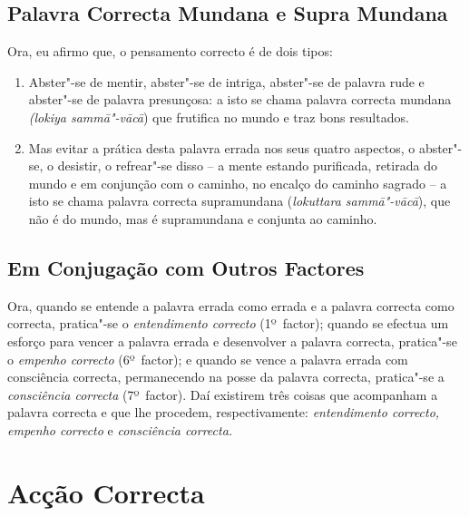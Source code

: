 
\subsection{Palavra Correcta Mundana e Supra Mundana}

Ora, eu afirmo que, o pensamento correcto é de dois tipos:

\begin{enumerate}

  \item Abster"-se de mentir, abster"-se de intriga, abster"-se de palavra rude e
        abster"-se de palavra presunçosa: a isto se chama palavra correcta
        mundana \emph{(lokiya sammā"-vācā}) que frutifica no mundo e traz bons
        resultados.

  \item Mas evitar a prática desta palavra errada nos seus quatro aspectos, o
        abster"-se, o desistir, o refrear"-se disso -- a mente estando purificada,
        retirada do mundo e em conjunção com o caminho, no encalço do caminho
        sagrado -- a isto se chama palavra correcta supramundana
        (\emph{lokuttara sammā"-vācā}), que não é do mundo, mas é supramundana e
        conjunta ao caminho.

\end{enumerate}

\subsection{Em Conjugação com Outros Factores}

Ora, quando se entende a palavra errada como errada e a palavra correcta como
correcta, pratica"-se o \emph{entendimento correcto} (1º~factor); quando se
efectua um esforço para vencer a palavra errada e desenvolver a palavra
correcta, pratica"-se o \emph{empenho correcto} (6º~factor); e quando se vence a
palavra errada com consciência correcta, permanecendo na posse da palavra
correcta, pratica"-se a \emph{consciência correcta} (7º~factor). Daí existirem
três coisas que acompanham a palavra correcta e que lhe procedem,
respectivamente: \emph{entendimento correcto, empenho correcto} e
\emph{consciência correcta.}


\section{Acção Correcta}

